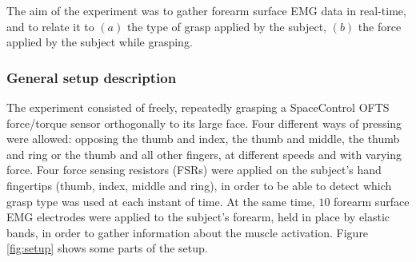 The aim of the experiment was to gather forearm surface EMG data in
real-time, and to relate it to $(a)$ the type of grasp applied by the
subject, $(b)$ the force applied by the subject while grasping.

\subsubsection{General setup description}

The experiment consisted of freely, repeatedly grasping a SpaceControl
OFTS force/torque sensor \cite{ofts} orthogonally to its large
face. Four different ways of pressing were allowed: opposing the thumb
and index, the thumb and middle, the thumb and ring or the thumb and
all other fingers, at different speeds and with varying force. Four
force sensing resistors (FSRs) were applied on the subject's hand
fingertips (thumb, index, middle and ring), in order to be able to
detect which grasp type was used at each instant of time. At the same
time, $10$ forearm surface EMG electrodes were applied to the
subject's forearm, held in place by elastic bands, in order to gather
information about the muscle activation. Figure \ref{fig:setup} shows
some parts of the setup.

